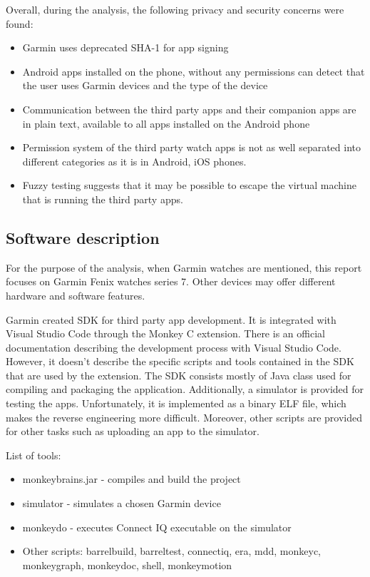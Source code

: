 Overall, during the analysis, the following privacy and security concerns were found:
\begin{itemize}
    \item Garmin uses deprecated SHA-1 for app signing
    \item Android apps installed on the phone, without any permissions can detect that the user uses Garmin devices and the type of the device
    \item Communication between the third party apps and their companion apps are in plain text, available to all apps installed on the Android phone
    \item Permission system of the third party watch apps is not as well separated into different categories as it is in Android, iOS phones.
    \item Fuzzy testing suggests that it may be possible to escape the virtual machine that is running the third party apps.
\end{itemize}

\subsection{Software description}

For the purpose of the analysis, when Garmin watches are mentioned, this report focuses on Garmin Fenix watches series 7.
Other devices may offer different hardware and software features.

Garmin created SDK for third party app development.
It is integrated with Visual Studio Code through the Monkey C extension.
There is an official documentation describing the development process with Visual Studio Code.
However, it doesn't describe the specific scripts and tools contained in the SDK that are used by the extension.
The SDK consists mostly of Java class used for compiling and packaging the application.
Additionally, a simulator is provided for testing the apps.
Unfortunately, it is implemented as a binary ELF file, which makes the reverse engineering more difficult.
Moreover, other scripts are provided for other tasks such as uploading an app to the simulator.

List of tools:

\begin{itemize}
    \item monkeybrains.jar - compiles and build the project
    \item simulator - simulates a chosen Garmin device
    \item monkeydo - executes Connect IQ executable on the simulator
    \item Other scripts: barrelbuild, barreltest, connectiq, era, mdd, monkeyc, monkeygraph, monkeydoc, shell, monkeymotion
\end{itemize}
